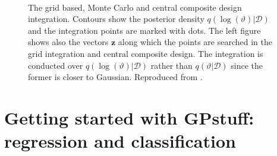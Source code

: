 \documentclass[twoside,11pt]{article}
\newcommand{\mb}{\mathbf}
\newcommand{\pkg}[1]{{\fontseries{b}\selectfont #1}}
\begin{document}
\begin{figure}
  \begin{center}
    ~
  \end{center}\caption{The grid based, Monte Carlo and central
    composite design integration. Contours show the posterior density
    $q(\log(\vartheta)|\mathcal{D})$ and the integration points are
    marked with dots. The left figure shows also the vectors $\mb{z}$
    along which the points are searched in the grid integration and
    central composite design. The integration is conducted over
    $q(\log(\vartheta)|\mathcal{D})$ rather than
    $q(\vartheta|\mathcal{D})$ since the former is closer to Gaussian.
    Reproduced from \citep{Vanhatalo+Pietilainen+Vehtari:2010}.}
  \label{hyperparameter_intergation}
\end{figure}


\section[Getting started with GPstuff: regression and classification]{Getting started with \pkg{GPstuff}: regression and classification}\label{chap:intro_to_GPstuff}
\end{document}

